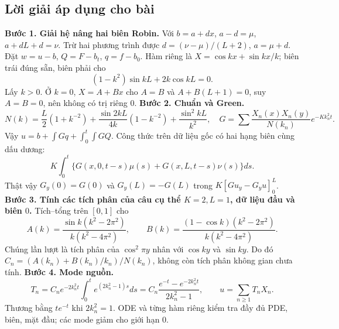 \documentclass[10pt,a4paper]{article}
\begin{document}
\subsection*{Lời giải áp dụng cho bài}
\textbf{Bước 1. Giải hệ nâng hai biên Robin.}
Với $b=a+dx$, $a-d=\mu$, $a+dL+d=\nu$. Trừ hai phương trình được $d=(\nu-\mu)/(L+2)$, $a=\mu+d$. Đặt $w=u-b$, $Q=F-b_t$, $q=f-b_0$. Hàm riêng là $X=\cos kx+\sin kx/k$; biên trái đúng sẵn, biên phải cho
\[(1-k^2)\sin kL+2k\cos kL=0.\]
Lấy $k>0$. Ở $k=0$, $X=A+Bx$ cho $A=B$ và $A+B(L+1)=0$, suy $A=B=0$, nên không có trị riêng $0$.
\textbf{Bước 2. Chuẩn và Green.}
\[N(k)=\frac L2(1+k^{-2})+\frac{\sin2kL}{4k}(1-k^{-2})+\frac{\sin^2kL}{k^2},\quad
G=\sum\frac{X_n(x)X_n(y)}{N(k_n)}e^{-Kk_n^2t}.\]
Vậy $u=b+\int Gq+\int_0^t\int GQ$. Công thức trên dữ liệu gốc có hai hạng biên cùng dấu dương:
\[K\int_0^t\{G(x,0,t-s)\mu(s)+G(x,L,t-s)\nu(s)\}ds.\]
Thật vậy $G_y(0)=G(0)$ và $G_y(L)=-G(L)$ trong $K[Gu_y-G_yu]_0^L$.
\textbf{Bước 3. Tính các tích phân của câu cụ thể $K=2,L=1$, dữ liệu đầu và biên $0$.}
Tích–tổng trên $[0,1]$ cho
\[A(k)=\frac{\sin k(k^2-2\pi^2)}{k(k^2-4\pi^2)},\qquad
B(k)=\frac{(1-\cos k)(k^2-2\pi^2)}{k(k^2-4\pi^2)}.\]
Chúng lần lượt là tích phân của $\cos^2\pi y$ nhân với $\cos ky$ và $\sin ky$. Do đó $C_n=(A(k_n)+B(k_n)/k_n)/N(k_n)$, không còn tích phân không gian chưa tính.
\textbf{Bước 4. Mode nguồn.}
\[T_n=C_ne^{-2k_n^2t}\int_0^te^{(2k_n^2-1)s}ds
=C_n\frac{e^{-t}-e^{-2k_n^2t}}{2k_n^2-1},\qquad
u=\sum_{n\ge1}T_nX_n.\]
Thương bằng $te^{-t}$ khi $2k_n^2=1$. ODE và từng hàm riêng kiểm tra đầy đủ PDE, biên, mặt đầu; các mode giảm cho giới hạn $0$.
\end{document}
